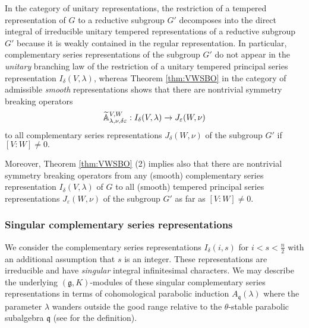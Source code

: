 In the category of unitary representations, 
 the restriction of a tempered representation of $G$
 to a reductive subgroup $G'$
 decomposes into the direct integral 
 of irreducible unitary tempered representations
 of a reductive subgroup $G'$
 because it is weakly contained 
 in the regular representation.  
In particular, 
 complementary series representations of the subgroup $G'$ do not appear
 in the {\it{unitary}} branching law
 of the restriction of a unitary tempered principal series  representation 
 $I_\delta(V,\lambda)$, 
 whereas Theorem \ref{thm:VWSBO}
 in the category of admissible {\it{smooth}} representations shows that there are  nontrivial symmetry breaking operators 
\[ 
  {\widetilde{\mathbb{A}}}_{{\lambda},{\nu},{\delta\varepsilon}}^{{V,W}} : I_\delta(V,\lambda) \rightarrow J_\varepsilon(W,\nu)
\]
 to all complementary series representations $J_\delta(W,\nu)$
 of the subgroup $G'$ if $[V:W] \not = 0.$



Moreover,
 Theorem \ref{thm:VWSBO} (2) implies also 
 that there are nontrivial symmetry breaking operators from
 any (smooth) complementary series representation
 $I_{\delta}(V,\lambda)$
 of $G$ to all (smooth) tempered principal series representations
 $J_{\varepsilon}(W,\nu)$ of the subgroup $G'$
 as far as $[V:W] \ne 0$.



\subsubsection{Singular complementary series representations}
\label{subsec:singcomp}
We consider the complementary series representations $I_\delta(i,s)$ 
 for $i < s< \frac n 2$ 
 with an additional assumption
 that $s$ is an integer.  
These representations are irreducible
 and have {\it{singular}} integral infinitesimal characters. 
We may describe the underlying $({\mathfrak{g}},K)$-modules
 of these singular complementary series representations
 in terms of cohomological parabolic induction 
 $A_{\mathfrak{q}}(\lambda)$
 where the parameter $\lambda$ wanders outside
 the good range
 relative to the $\theta$-stable parabolic subalgebra ${\mathfrak{q}}$
 (see \cite[Def.~0.49]{KV} for the definition).  


